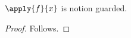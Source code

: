 

\begin{proposition}\label{notion_presentation_apply}
    $\apply{f}{x}$ is notion guarded.
\end{proposition}
\begin{proof}
    Follows.
\end{proof}
